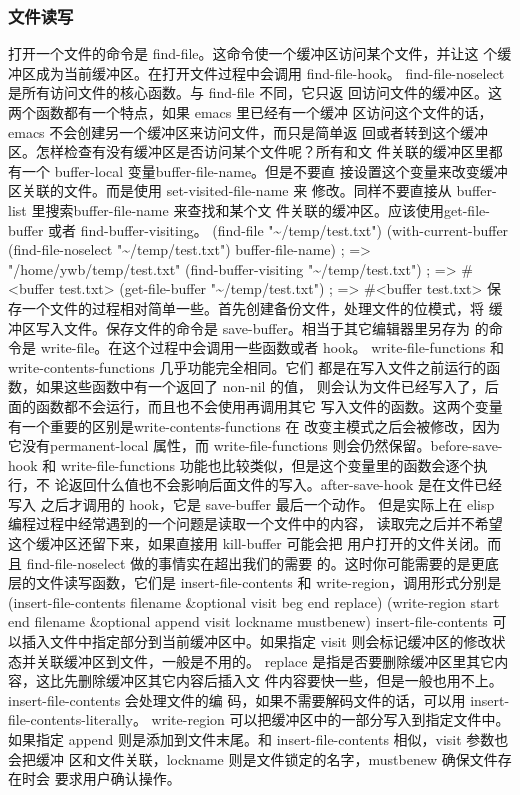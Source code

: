 \documentclass[11pt]{ctexart}
\begin{document}
{{{{\subsubsection{文件读写}
\label{sec:orgab65a6e}
打开一个文件的命令是 find-file。这命令使一个缓冲区访问某个文件，并让这 个缓冲区成为当前缓冲区。在打开文件过程中会调用 find-file-hook。 find-file-noselect 是所有访问文件的核心函数。与 find-file 不同，它只返 回访问文件的缓冲区。这两个函数都有一个特点，如果 emacs 里已经有一个缓冲 区访问这个文件的话，emacs 不会创建另一个缓冲区来访问文件，而只是简单返 回或者转到这个缓冲区。怎样检查有没有缓冲区是否访问某个文件呢？所有和文 件关联的缓冲区里都有一个 buffer-local 变量buffer-file-name。但是不要直 接设置这个变量来改变缓冲区关联的文件。而是使用 set-visited-file-name 来 修改。同样不要直接从 buffer-list 里搜索buffer-file-name 来查找和某个文 件关联的缓冲区。应该使用get-file-buffer 或者 find-buffer-visiting。
(find-file "\textasciitilde{}/temp/test.txt")
(with-current-buffer
(find-file-noselect "\textasciitilde{}/temp/test.txt")
buffer-file-name)                     ; => "/home/ywb/temp/test.txt"
(find-buffer-visiting "\textasciitilde{}/temp/test.txt") ; => \#<buffer test.txt>
(get-file-buffer "\textasciitilde{}/temp/test.txt")      ; => \#<buffer test.txt>
保存一个文件的过程相对简单一些。首先创建备份文件，处理文件的位模式，将 缓冲区写入文件。保存文件的命令是 save-buffer。相当于其它编辑器里另存为 的命令是 write-file。在这个过程中会调用一些函数或者 hook。 write-file-functions 和 write-contents-functions 几乎功能完全相同。它们 都是在写入文件之前运行的函数，如果这些函数中有一个返回了 non-nil 的值， 则会认为文件已经写入了，后面的函数都不会运行，而且也不会使用再调用其它 写入文件的函数。这两个变量有一个重要的区别是write-contents-functions 在 改变主模式之后会被修改，因为它没有permanent-local 属性，而 write-file-functions 则会仍然保留。before-save-hook 和 write-file-functions 功能也比较类似，但是这个变量里的函数会逐个执行，不 论返回什么值也不会影响后面文件的写入。after-save-hook 是在文件已经写入 之后才调用的 hook，它是 save-buffer 最后一个动作。
但是实际上在 elisp 编程过程中经常遇到的一个问题是读取一个文件中的内容， 读取完之后并不希望这个缓冲区还留下来，如果直接用 kill-buffer 可能会把 用户打开的文件关闭。而且 find-file-noselect 做的事情实在超出我们的需要 的。这时你可能需要的是更底层的文件读写函数，它们是 insert-file-contents 和 write-region，调用形式分别是
(insert-file-contents filename \&optional visit beg end replace)
(write-region start end filename \&optional append visit lockname mustbenew)
insert-file-contents 可以插入文件中指定部分到当前缓冲区中。如果指定 visit 则会标记缓冲区的修改状态并关联缓冲区到文件，一般是不用的。 replace 是指是否要删除缓冲区里其它内容，这比先删除缓冲区其它内容后插入文 件内容要快一些，但是一般也用不上。insert-file-contents 会处理文件的编 码，如果不需要解码文件的话，可以用 insert-file-contents-literally。
write-region 可以把缓冲区中的一部分写入到指定文件中。如果指定 append 则是添加到文件末尾。和 insert-file-contents 相似，visit 参数也会把缓冲 区和文件关联，lockname 则是文件锁定的名字，mustbenew 确保文件存在时会 要求用户确认操作。
}}}}
\end{document}
